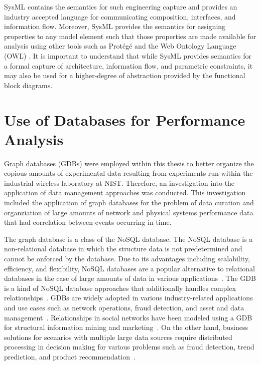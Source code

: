 SysML contains the semantics for such engineering capture and provides an industry accepted language for communicating composition, interfaces, and information flow. Moreover, SysML provides the semantics for assigning properties to any model element such that those properties are made  available for analysis using other tools such as Prot\'eg\'e \cite{StanfordUniversity.Protege} and the Web Ontology Language (OWL) \cite{W3C2012.OWL}.
It is important to understand that while SysML provides semantics for a formal capture of architecture, information flow, and parametric constraints, it may also be used for a higher-degree of abstraction provided by the functional block diagrams.  

\section{Use of Databases for Performance Analysis}
Graph databases (GDBs) were employed within this thesis to better organize the copious amounts of experimental data resulting from experiments run within the industrial wireless laboratory at NIST.  Therefore, an investigation into the application of data management approaches was conducted.  This investigation included the application of graph databases for the problem of data curation and organziation of large amounts of network and physical systems performance data that had correlation between events occurring in time.

The graph database is a class of the NoSQL database.  The NoSQL database is a non-relational database in which the structure data is not predetermined and cannot be onforced by the database.  Due to its advantages including scalability, efficiency, and flexibility, NoSQL databases are a popular alternative to relational databases in the case of large amounts of data in various applications~\cite{doi:10.1108/17440081311316398}. The GDB is a kind of NoSQL database approaches that additionally handles complex relationships~\cite{8123475}. GDBs are widely adopted in various industry-related applications and use cases such as network operations, fraud detection, and asset and data management~\cite{top5}. Relationships in social networks have been modeled using a GDB for structural information mining and marketing~\cite{Gomez-Rodriguez:2012:IND:2086737.2086741}. On the other hand, business solutions for scenarios with multiple large data sources require distributed processing in decision making for various problems such as fraud detection, trend prediction, and product recommendation~\cite{Skhiri2013}.

